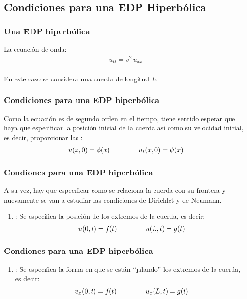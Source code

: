 \documentclass[12pt]{beamer}
\begin{document}
\subsection{Condiciones para una EDP Hiperbólica}

\begin{frame}
\frametitle{Una EDP hiperbólica}
La ecuación de onda:
\pause
\begin{align*}
u_{tt} = v^{2} \, u_{xx}
\end{align*}
\\
\bigskip
\pause
En este caso se considera una cuerda de longitud $L$.
\end{frame}
\begin{frame}
\frametitle{Condiciones para una EDP hiperbólica}
Como la ecuación es de segundo orden en el tiempo, tiene sentido esperar que haya que especificar la posición inicial de la cuerda así como su velocidad inicial, es decir, proporcionar las :
\pause
\begin{align}
u (x, 0) = \phi (x) \hspace{1.5cm} u_{t} (x, 0) = \psi (x)
\label{eq:ecuacion_06_02_07}
\end{align}
\end{frame}
\begin{frame}
\frametitle{Condiones para una EDP hiperbólica}
A su vez, hay que especificar como se relaciona la cuerda con su frontera y nuevamente se van a estudiar las condiciones de Dirichlet y de Neumann.
\pause
{}
\begin{enumerate}[<+->]
\item {}: Se especifica la posición de los extremos de la cuerda, es decir:
\begin{align}
u(0, t) = f (t) \hspace{1.5cm} u(L, t) = g(t)
\label{eq:ecuacion_06_02_08}   
\end{align}
\seti
\end{enumerate}
\end{frame}
\begin{frame}
\frametitle{Condiones para una EDP hiperbólica}
\begin{enumerate}[<+->]
\conti    
\item {}: Se especifica la forma en que se están \enquote{jalando} los extremos de la cuerda, es decir:
\begin{align}
u_{x} (0, t) = f (t) \hspace{1.5cm} u_{x} (L, t) = g (t)
\label{eq:ecuacion_06_02_09}    
\end{align}
\end{enumerate}
\end{frame}
\end{document}
